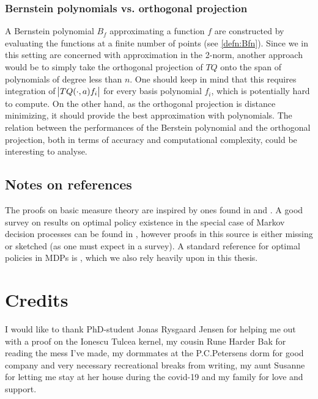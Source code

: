 \subsubsection{Bernstein polynomials vs. orthogonal projection}
A Bernstein polynomial $B_f$ approximating a function $f$
are constructed by evaluating the
functions at a finite number of points (see \cref{defn:Bfn}).
Since we in this setting are concerned with approximation in the 2-norm,
another approach would be to simply take the orthogonal projection of
$TQ$ onto the span of polynomials of degree less than $n$.
One should keep in mind that this requires integration of
$\abs{TQ(\cdot, a) f_i}$ for every basis polynomial $f_i$,
which is potentially hard to compute.
On the other hand, as the orthogonal projection is distance minimizing,
it should provide the best approximation with polynomials.
The relation between the performances of the Berstein polynomial
and the orthogonal projection, both in terms of accuracy and 
computational complexity, could be interesting to analyse.

\subsection{Notes on references}
The proofs on basic measure theory are inspired by ones found in
 and .
A good survey on results on optimal policy existence in the special case
of Markov decision processes can be found in ,
however proofs in this source is either missing or sketched
(as one must expect in a survey).
A standard reference for optimal policies in MDPs is ,
which we also rely heavily upon in this thesis.

\section{Credits}
I would like to thank PhD-student Jonas Rysgaard Jensen for helping me
out with a proof on the Ionescu Tulcea kernel,
my cousin Rune Harder Bak for reading the mess I've made,
my dormmates at the P.C.Petersens dorm for good company and very necessary
recreational breaks from writing,
my aunt Susanne for letting me stay at her house during the covid-19 and
my family for love and support.

